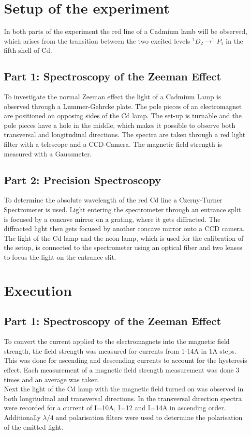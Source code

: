 \documentclass[12pt]{article}
\begin{document}
\section{Setup of the experiment}
In both parts of the experiment the red line of a Cadmium lamb will be observed, which arises from the transition between the two excited levels $^1D_2\rightarrow^1P_1$ in the fifth shell of Cd.
\subsection{Part 1: Spectroscopy of the Zeeman Effect}
To investigate the normal Zeeman effect the light of a Cadmium Lamp is observed through a Lummer-Gehrcke plate. The pole pieces of an electromagnet are positioned on opposing sides of the Cd lamp. The set-up is turnable and the pole pieces have a hole in the middle, which makes it possible to observe both transversal and longitudinal directions. The spectra are taken through a red light filter with a telescope and a CCD-Camera. The magnetic field strength is measured with a Gaussmeter.
\subsection{Part 2: Precision Spectroscopy}
To determine the absolute wavelength of the red Cd line a Czerny-Turner Spectrometer is used. Light entering the spectrometer through an entrance split is focused by a concave mirror on a grating, where it gets diffracted. The diffracted light then gets focused by another concave mirror onto a CCD camera. The light of the Cd lamp and the neon lamp, which is used for the calibration of the setup, is connected to the spectrometer using an optical fiber and two lenses to focus the light on the entrance slit. 

\section{Execution}
\subsection{Part 1: Spectroscopy of the Zeeman Effect}
To convert the current applied to the electromagnets into the magnetic field strength, the field strength was measured for currents from 1-14A in 1A steps. This was done for ascending and descending currents to account for the hysteresis effect. Each measurement of a magnetic field strength measurement was done 3 times and an average was taken.
\\Next the light of the Cd lamp with the magnetic field turned on was observed in both longitudinal and transversal directions. In the transversal direction spectra were recorded for a current of I=10A, I=12 and I=14A in ascending order. Additionally $\lambda/4$ and polarisation filters were used to determine the polarisation of the emitted light. 
\end{document}
